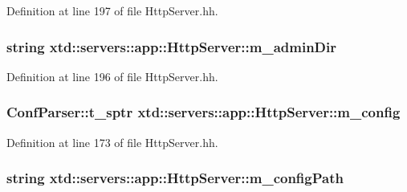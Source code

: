 Definition at line 197 of file Http\+Server.\+hh.

\subsubsection[{\texorpdfstring{m\+\_\+admin\+Dir}{m_adminDir}}]{\setlength{\rightskip}{0pt plus 5cm}string xtd\+::servers\+::app\+::\+Http\+Server\+::m\+\_\+admin\+Dir\hspace{0.3cm}{\ttfamily [protected]}}\hypertarget{classxtd_1_1servers_1_1app_1_1HttpServer_ad12543f950574ac8a0d813cb4ceeff4c}{}\label{classxtd_1_1servers_1_1app_1_1HttpServer_ad12543f950574ac8a0d813cb4ceeff4c}


Definition at line 196 of file Http\+Server.\+hh.

\subsubsection[{\texorpdfstring{m\+\_\+config}{m_config}}]{\setlength{\rightskip}{0pt plus 5cm}Conf\+Parser\+::t\+\_\+sptr xtd\+::servers\+::app\+::\+Http\+Server\+::m\+\_\+config\hspace{0.3cm}{\ttfamily [protected]}}\hypertarget{classxtd_1_1servers_1_1app_1_1HttpServer_ada282c895467a8d2fcaee543560958dc}{}\label{classxtd_1_1servers_1_1app_1_1HttpServer_ada282c895467a8d2fcaee543560958dc}


Definition at line 173 of file Http\+Server.\+hh.

\subsubsection[{\texorpdfstring{m\+\_\+config\+Path}{m_configPath}}]{\setlength{\rightskip}{0pt plus 5cm}string xtd\+::servers\+::app\+::\+Http\+Server\+::m\+\_\+config\+Path\hspace{0.3cm}{\ttfamily [protected]}}\hypertarget{classxtd_1_1servers_1_1app_1_1HttpServer_aa07526617267875dd907e29b99711ab6}{}\label{classxtd_1_1servers_1_1app_1_1HttpServer_aa07526617267875dd907e29b99711ab6}


